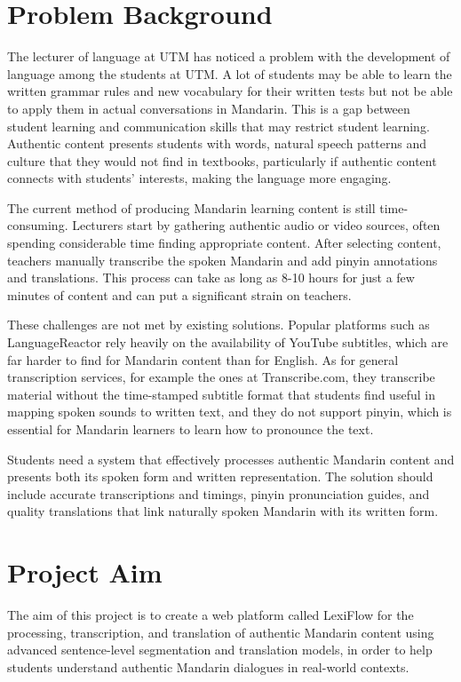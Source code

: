 \documentclass[oneside]{utmthesis}
\begin{document}
\section{Problem Background}

The lecturer of language at UTM has noticed a problem with the development of language among the students at UTM. A lot of students may be able to learn the written grammar rules and new vocabulary for their written tests but not be able to apply them in actual conversations in Mandarin. This is a gap between student learning and communication skills that may restrict student learning. Authentic content presents students with words, natural speech patterns and culture that they would not find in textbooks, particularly if authentic content connects with students' interests, making the language more engaging.

The current method of producing Mandarin learning content is still time-consuming. Lecturers start by gathering authentic audio or video sources, often spending considerable time finding appropriate content. After selecting content, teachers manually transcribe the spoken Mandarin and add pinyin annotations and translations. This process can take as long as 8-10 hours for just a few minutes of content and can put a significant strain on teachers.

These challenges are not met by existing solutions. Popular platforms such as LanguageReactor rely heavily on the availability of YouTube subtitles, which are far harder to find for Mandarin content than for English. As for general transcription services, for example the ones at Transcribe.com, they transcribe material without the time-stamped subtitle format that students find useful in mapping spoken sounds to written text, and they do not support pinyin, which is essential for Mandarin learners to learn how to pronounce the text.

Students need a system that effectively processes authentic Mandarin content and presents both its spoken form and written representation. The solution should include accurate transcriptions and timings, pinyin pronunciation guides, and quality translations that link naturally spoken Mandarin with its written form.
\section{Project Aim}
The aim of this project is to create a web platform called LexiFlow for the processing, transcription, and translation of authentic Mandarin content using advanced sentence-level segmentation and translation models, in order to help students understand authentic Mandarin dialogues in real-world contexts.
\end{document}
